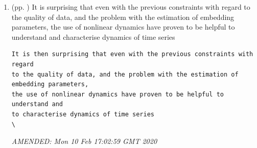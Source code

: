 \documentclass[10pt]{article}
\begin{document}
\begin{enumerate}
Thus, these nonlinear analysis methods for computing the embedding 
parameters can break down
with real-world datasets which have generally different length, 
different values of accuracy and precision (rounding errors due to finite 
precision of the measurement apparatus which include frequency 
acquisition \ cite{frank2010}),
and data may be contaminated with different sources of noise
\ cite{garland2016}.

\begin{verbatim}
Thus, these methods of nonlinear analysis for computing the embedding 
parameters can break down
with real-world datasets which have generally different length, 
different values of accuracy and precision (rounding errors due to finite 
precision of the measurement apparatus which include frequency 
acquisition \cite{frank2010}),
and contaminated data with different sources of noise
\cite{garland2016}.
\end{verbatim}
	\textit{
	AMENDED: 
Mon 10 Feb 17:00:32 GMT 2020
	}
	\\


\item  (pp. ) 
It is surprising that even with the previous constraints with regard 
to the quality of data, and the problem with the estimation of embedding parameters,
the use of nonlinear dynamics have proven to be helpful to understand and 
characterise dynamics of time series 
\
\begin{verbatim}
It is then surprising that even with the previous constraints with regard 
to the quality of data, and the problem with the estimation of 
embedding parameters,
the use of nonlinear dynamics have proven to be helpful to understand and 
to characterise dynamics of time series 
\
\end{verbatim}
	\textit{
	AMENDED: Mon 10 Feb 17:02:59 GMT 2020
	}
	\\



\end{enumerate}



\end{document}
